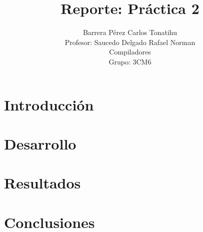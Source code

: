 \documentclass[titlepage]{article}
\title{Reporte: Práctica 2}
\author{Barrera Pérez Carlos Tonatihu \\ Profesor: Saucedo Delgado Rafael Norman \\ Compiladores \\ Grupo: 3CM6 }
\begin{document}
  \maketitle
  \tableofcontents
  \newpage
  \section{Introducción}
  \section{Desarrollo}
  \section{Resultados}
  \section{Conclusiones}
\end{document}
